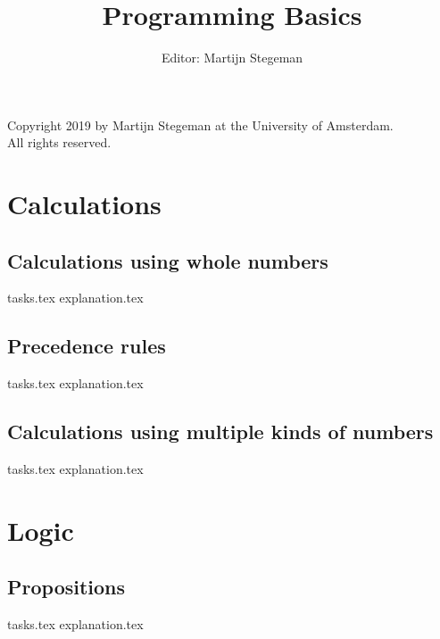 \def\doclang{english}
\def\langdir{en}




    \title{Programming Basics}
    \author{Editor: Martijn Stegeman}
    \maketitle

    Copyright 2019 by Martijn Stegeman at the University of Amsterdam.\\
    All rights reserved.

    \tableofcontents

    \chapter{Calculations}
    \newpage

    \section{Calculations using whole numbers}
    {tasks.tex}          \newpage
    {explanation.tex}       \newpage

    \section{Precedence rules}
    {tasks.tex}        \newpage
    {explanation.tex}     \newpage

    \section{Calculations using multiple kinds of numbers}
    {tasks.tex}            \newpage
    {explanation.tex}         \newpage

    \chapter{Logic}
    \newpage

    \section{Propositions}
    {tasks.tex}         \newpage
    {explanation.tex}      \newpage

